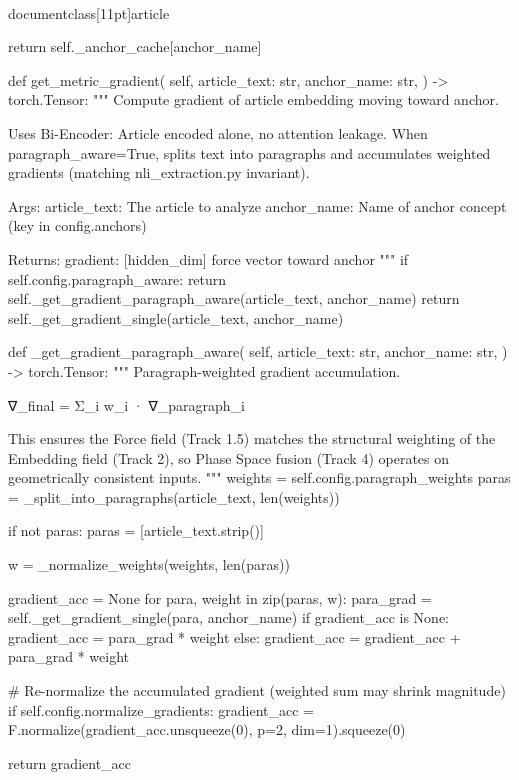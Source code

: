 \\documentclass[11pt]{article}
\begin{document}
\begin{CodeBlock}
        return self._anchor_cache[anchor_name]
    
    def get_metric_gradient(
        self,
        article_text: str,
        anchor_name: str,
    ) -> torch.Tensor:
        """
        Compute gradient of article embedding moving toward anchor.

        Uses Bi-Encoder: Article encoded alone, no attention leakage.
        When paragraph_aware=True, splits text into paragraphs and
        accumulates weighted gradients (matching nli_extraction.py invariant).

        Args:
            article_text: The article to analyze
            anchor_name: Name of anchor concept (key in config.anchors)

        Returns:
            gradient: [hidden_dim] force vector toward anchor
        """
        if self.config.paragraph_aware:
            return self._get_gradient_paragraph_aware(article_text, anchor_name)
        return self._get_gradient_single(article_text, anchor_name)

    def _get_gradient_paragraph_aware(
        self,
        article_text: str,
        anchor_name: str,
    ) -> torch.Tensor:
        """
        Paragraph-weighted gradient accumulation.

        ∇_final = Σ_i w_i · ∇_paragraph_i

        This ensures the Force field (Track 1.5) matches the structural
        weighting of the Embedding field (Track 2), so Phase Space fusion
        (Track 4) operates on geometrically consistent inputs.
        """
        weights = self.config.paragraph_weights
        paras = _split_into_paragraphs(article_text, len(weights))

        if not paras:
            paras = [article_text.strip()]

        w = _normalize_weights(weights, len(paras))

        gradient_acc = None
        for para, weight in zip(paras, w):
            para_grad = self._get_gradient_single(para, anchor_name)
            if gradient_acc is None:
                gradient_acc = para_grad * weight
            else:
                gradient_acc = gradient_acc + para_grad * weight

        # Re-normalize the accumulated gradient (weighted sum may shrink magnitude)
        if self.config.normalize_gradients:
            gradient_acc = F.normalize(gradient_acc.unsqueeze(0), p=2, dim=1).squeeze(0)

        return gradient_acc


\end{CodeBlock}
\end{document}
